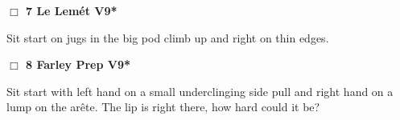 \begin{multicols}{2}
\needspace{2em}
\label{rt:Le Lemét}
\colorbox{Goldenrod!20}{
\parbox{0.95\linewidth}{
\hspace{-1ex}\textbf{$\Box$
7 Le Lemét V9*  
}}}
\begin{adjustwidth}{1.3em}{}			

Sit start on jugs in the big pod climb up and right on thin edges.
\end{adjustwidth}




\needspace{2em}
\label{rt:Farley Prep}
\colorbox{Goldenrod!20}{
\parbox{0.95\linewidth}{
\hspace{-1ex}\textbf{$\Box$
8 Farley Prep V9*  
}}}
\begin{adjustwidth}{1.3em}{}			

Sit start with left hand on a small underclinging side pull and right hand on a lump on the arête. The lip is right there, how hard could it be?
\end{adjustwidth}






\end{multicols}
\clearpage